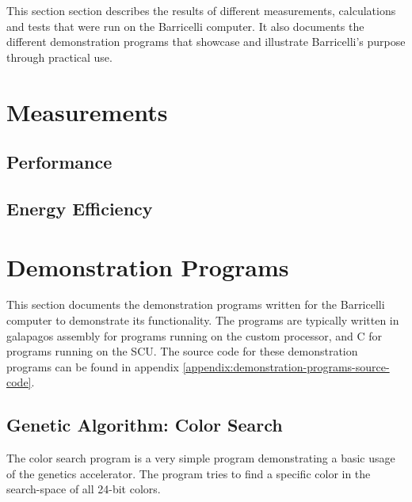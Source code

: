 This section section describes the results of different measurements, calculations and tests that were run on the Barricelli computer.
It also documents the different demonstration programs that showcase and illustrate Barricelli's purpose through practical use.

\section{Measurements}

\subsection{Performance}





\subsection{Energy Efficiency}


\section{Demonstration Programs}

This section documents the demonstration programs written for the Barricelli computer to demonstrate its functionality.
The programs are typically written in \gls{galapagos} assembly for programs running on the custom processor, and C for programs running on the \Gls{SCU}.
The source code for these demonstration programs can be found in appendix \vref{appendix:demonstration-programs-source-code}.

\subsection{Genetic Algorithm: Color Search}

The color search program is a very simple program demonstrating a basic usage of the genetics accelerator.
The program tries to find a specific color in the search-space of all 24-bit colors.


